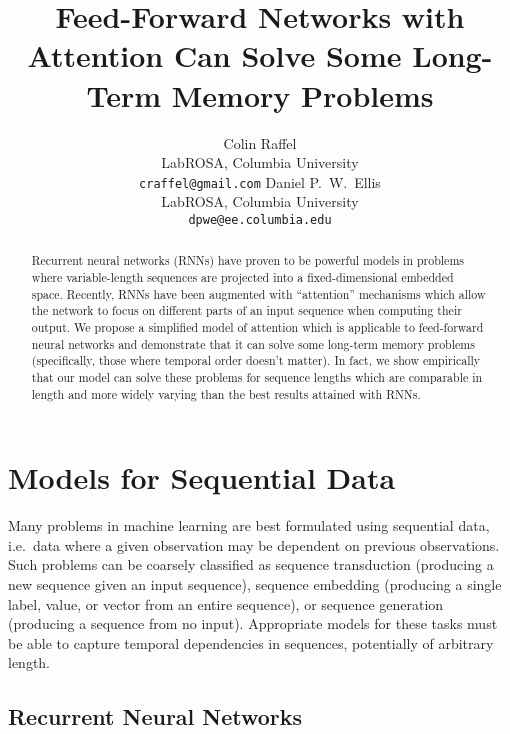 \documentclass{article} %
\title{Feed-Forward Networks with Attention Can Solve Some Long-Term Memory Problems}
\author{
Colin Raffel\\
LabROSA, Columbia University\\
\texttt{craffel@gmail.com}
\And
Daniel P.~W.~Ellis\\
LabROSA, Columbia University\\
\texttt{dpwe@ee.columbia.edu}
}
\begin{document}
\maketitle

\begin{abstract}
Recurrent neural networks (RNNs) have proven to be powerful models in problems where variable-length sequences are projected into a fixed-dimensional embedded space.
Recently, RNNs have been augmented with ``attention'' mechanisms which allow the network to focus on different parts of an input sequence when computing their output.
We propose a simplified model of attention which is applicable to feed-forward neural networks and demonstrate that it can solve some long-term memory problems (specifically, those where temporal order doesn't matter).
In fact, we show empirically that our model can solve these problems for sequence lengths which are comparable in length and more widely varying than the best results attained with RNNs.
\end{abstract}

\section{Models for Sequential Data}

Many problems in machine learning are best formulated using sequential data, i.e.\ data where a given observation may be dependent on previous observations.
Such problems can be coarsely classified as sequence transduction (producing a new sequence given an input sequence), sequence embedding (producing a single label, value, or vector from an entire sequence), or sequence generation (producing a sequence from no input).
Appropriate models for these tasks must be able to capture temporal dependencies in sequences, potentially of arbitrary length.

\subsection{Recurrent Neural Networks}
\end{document}
